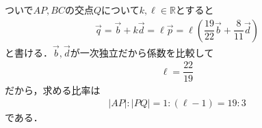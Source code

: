 \documentclass[../../main.tex]{subfiles}
\begin{document}
ついで$AP,BC$の交点$Q$について$k,\ell\in\mathbb{R}$とすると
\begin{align}
  \vec q=\vec b+k\vec d=\ell\vec{p} = \ell \left(\dfrac{19}{22}\vec b+\dfrac{8}{11}\vec d\right)
\end{align}
と書ける．$\vec{b},\vec{d}$が一次独立だから係数を比較して
\begin{align}
  \ell=\dfrac{22}{19}
\end{align}
だから，求める比率は
\begin{align}
  |AP|:|PQ|=1:(\ell-1) = 19:3
\end{align}
である．

\newpage
\end{document}
